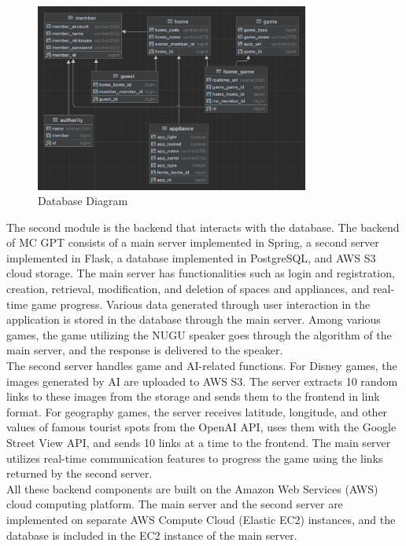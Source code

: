 \documentclass[conference]{IEEEtran}
\begin{document}
            \begin{figure}[htbp]
                \centerline{\includegraphics[width = 9cm]{Images/archi/erd.png}}
                \label{fig}
                \caption{Database Diagram}
            \end{figure}
            The second module is the backend that interacts with the database. The backend of MC GPT consists of a main server implemented in Spring, a second server implemented in Flask, a database implemented in PostgreSQL, and AWS S3 cloud storage. The main server has functionalities such as login and registration, creation, retrieval, modification, and deletion of spaces and appliances, and real-time game progress. Various data generated through user interaction in the application is stored in the database through the main server. Among various games, the game utilizing the NUGU speaker goes through the algorithm of the main server, and the response is delivered to the speaker.\\
            The second server handles game and AI-related functions. For Disney games, the images generated by AI are uploaded to AWS S3. The server extracts 10 random links to these images from the storage and sends them to the frontend in link format. For geography games, the server receives latitude, longitude, and other values of famous tourist spots from the OpenAI API, uses them with the Google Street View API, and sends 10 links at a time to the frontend. The main server utilizes real-time communication features to progress the game using the links returned by the second server.\\
            All these backend components are built on the Amazon Web Services (AWS) cloud computing platform. The main server and the second server are implemented on separate AWS Compute Cloud (Elastic EC2) instances, and the database is included in the EC2 instance of the main server.\\
            \vspace{3mm}
            
\end{document}
